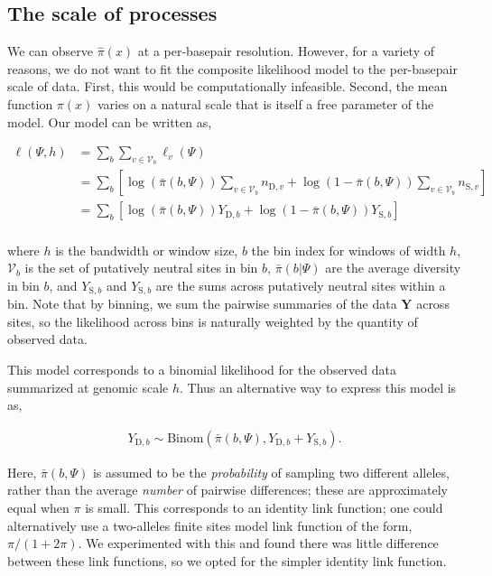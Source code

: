 \documentclass[11pt]{article}
\begin{document}
\subsection{The scale of processes}

We can observe $\widehat{\pi}(x)$ at a per-basepair resolution. However, for a
variety of reasons, we do not want to fit the composite likelihood model to the
per-basepair scale of data. First, this would be computationally infeasible.
Second, the mean function $\pi(x)$ varies on a natural scale that is itself a
free parameter of the model. Our model can be written as, 

\begin{align}
  \ell(\Psi, h) &= \sum_{b} \sum_{v \in \mathcal{V}_b} \ell_v(\Psi) \\
             &= \sum_{b} \left[\log(\bar{\pi}(b, \Psi)) \sum_{v \in \mathcal{V}_b} n_{\text{D},v} + \log(1-\bar{\pi}(b, \Psi)) \sum_{v \in \mathcal{V}_b} n_{\text{S},{v}}\right] \\
             &= \sum_{b} \left[\log(\bar{\pi}(b, \Psi)) Y_{\text{D},b} + \log(1-\bar{\pi}(b, \Psi)) Y_{\text{S},{b}}\right] \\
\end{align}

where $h$ is the bandwidth or window size, $b$ the bin index for windows of
width $h$, $\mathcal{V}_b$ is the set of putatively neutral sites in bin $b$,
$\bar{\pi}(b | \Psi)$ are the average diversity in bin $b$, and
$Y_{\text{S},b}$ and $Y_{\text{S},b}$ are the sums across putatively neutral
sites within a bin. Note that by binning, we sum the pairwise summaries of the
data $\mathbf{Y}$ across sites, so the likelihood across bins is naturally
weighted by the quantity of observed data. 



This model corresponds to a binomial likelihood for the observed data
summarized at genomic scale $h$. Thus an alternative way to express this model
is as, 

\begin{align}
  Y_{\text{D},b} \sim \text{Binom}(\bar{\pi}(b, \Psi), Y_{\text{D},b} + Y_{\text{S},b}).
\end{align}

Here, $\bar{\pi}(b, \Psi)$ is assumed to be the \emph{probability} of sampling
two different alleles, rather than the average \emph{number} of pairwise
differences; these are approximately equal when $\pi$ is small. This
corresponds to an identity link function; one could alternatively use a
two-alleles finite sites model link function of the form, $\pi/(1 + 2 \pi)$. We
experimented with this and found there was little difference between these link
functions, so we opted for the simpler identity link function.
\end{document}
